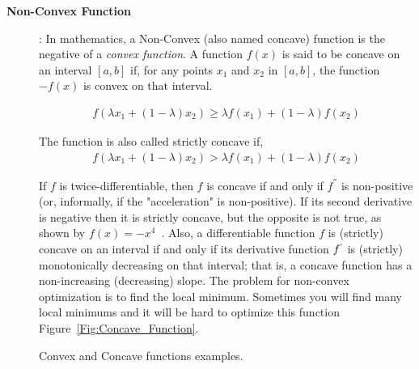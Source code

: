 \begin{description}
%


\item [\textbf{Non-Convex Function}]: In mathematics, a Non-Convex (also named concave) function is the negative of a \textit{convex function}. A function $f(x)$ is said to be concave on an interval $[a,b]$ if, for any points $x_1$ and $x_2$ in $[a,b]$, the function $-f(x)$ is convex on that interval.

\begin{equation}\label{eq:concave_fun}
 \begin{split}
f(\lambda x_1 + (1-\lambda)x_2) \geq \lambda f(x_1) + (1 - \lambda) f(x_2)
 \end{split}
\end{equation}

The function is also called strictly concave if,
\begin{equation}\label{eq:concave_fun_strictly}
 \begin{split}
f(\lambda x_1 + (1-\lambda)x_2) > \lambda f(x_1) + (1 - \lambda) f(x_2)
 \end{split}
\end{equation}

If $f$ is twice-differentiable, then $f$ is concave if and only if $f^{''}$ is non-positive (or, informally, if the "acceleration" is non-positive). If its second derivative is negative then it is strictly concave, but the opposite is not true, as shown by $f(x) = −x^4$~\cite{Wiki_Concave_Function}. Also, a differentiable function $f$ is (strictly) concave on an interval if and only if its derivative function $f^`$ is (strictly) monotonically decreasing on that interval; that is, a concave function has a non-increasing (decreasing) slope. The problem for non-convex optimization is to find the local minimum. Sometimes you will find many local minimums and it will be hard to optimize this function Figure~\ref{Fig:Concave_Function}.

\end{description}

\begin{figure}[t]
 \centering
\caption{Convex and Concave functions examples.}
\end{figure}
